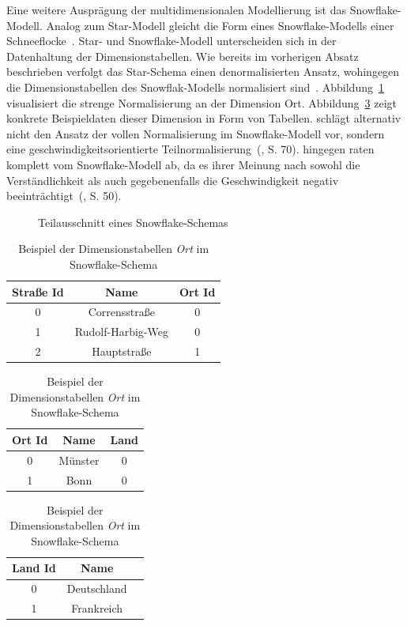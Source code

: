 \documentclass[
  language=german, %
  type=bachelor,%
  ngerman
]{isthesis}
\begin{document}
\begin{content}
  Eine weitere Ausprägung der multidimensionalen Modellierung ist das Snowflake-Modell.
  Analog zum Star-Modell gleicht die Form eines Snowflake-Modells einer
  Schneeflocke~\cite[][S. 70]{Kemper2010}. Star- und Snowflake-Modell
  unterscheiden sich in der Datenhaltung der Dimensionstabellen. Wie bereits im
  vorherigen Absatz beschrieben verfolgt das Star-Schema einen denormalisierten
  Ansatz, wohingegen die Dimensionstabellen des Snowflak-Modells normalisiert
  sind~\cite[][S. 70]{Kemper2010}. Abbildung~\ref{fig:snowflake-schema}
  visualisiert die strenge Normalisierung an der Dimension Ort.
  Abbildung~\ref{table:dimension-table-snow} zeigt konkrete Beispieldaten dieser
  Dimension in Form von Tabellen.  \textsc{\citeauthor{Kemper2010}} schlägt alternativ
  nicht den Ansatz der vollen Normalisierung im Snowflake-Modell vor, sondern eine
  geschwindigkeitsorientierte Teilnormalisierung~(\citeyear{Kemper2010}, S. 70).
  \textsc{\citeauthor{Kimball2013}} hingegen raten komplett vom Snowflake-Modell
  ab, da es ihrer Meinung nach sowohl die Verständlichkeit als auch gegebenenfalls die
  Geschwindigkeit negativ beeinträchtigt~(\citeyear{Kimball2013}, S. 50).

  \begin{figure}
    \resizebox{250pt}{!}{}
    \caption{Teilausschnitt eines Snowflake-Schemas}\label{fig:snowflake-schema}
  \end{figure}

  \begin{table}
    \footnotesize
    \begin{tabular}{c c c }
      Straße Id & Name & Ort Id \\
      \toprule
      0 & Corrensstraße & 0 \\
      1 & Rudolf-Harbig-Weg & 0 \\
      2 & Hauptstraße & 1 \\
    \end{tabular}
    \begin{tabular}{c c c}
      Ort Id & Name & Land \\
      \toprule
      0 & Münster & 0 \\
      1 & Bonn & 0 \\
    \end{tabular}
    \begin{tabular}{c c c }
      Land Id & Name \\
      \toprule
      0 & Deutschland \\
      1 & Frankreich \\
    \end{tabular}
    \caption{Beispiel der Dimensionstabellen \textit{Ort} im Snowflake-Schema}\label{table:dimension-table-snow}
  \end{table}


\end{content}
\end{document}

